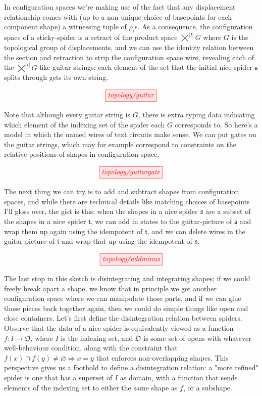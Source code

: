 In configuration spaces we're making use of the fact that any displacement relationship comes with (up to a non-unique choice of basepoints for each component shape)  a witnessing tuple of $\rho_i$s. As a consequence, the configuration space of a sticky-spider is a retract of the product space $\bigtimes^{|I|} G$ where $G$ is the topological group of displacements, and we can use the identity relation between the section and retraction to strip the configuration space wire, revealing each of the $\bigtimes^{|I|} G$ like guitar strings: each element of the set that the initial nice spider $\mathfrak{s}$ splits through gets its own string.

\[\tikzfig{topology/guitar}\]

Note that although every guitar string is $G$, there is extra typing data indicating which element of the indexing set of the spider each $G$ corresponds to. So here's a model in which the named wires of text circuits make sense. We can put gates on the guitar strings, which may for example correspond to constraints on the relative positions of shapes in configuration space.

\[\tikzfig{topology/guitargate}\]

The next thing we can try is to add and subtract shapes from configuration spaces, and while there are technical details like matching choices of basepoints I'll gloss over, the gist is this: when the shapes in a nice spider $\mathfrak{s}$ are a subset of the shapes in a nice spider $\mathfrak{t}$, we can add in states to the guitar-picture of $\mathfrak{s}$ and wrap them up again using the idempotent of $\mathfrak{t}$, and we can delete wires in the guitar-picture of $\mathfrak{t}$ and wrap that up using the idempotent of $\mathfrak{s}$.

\[\tikzfig{topology/addminus}\]

The last stop in this sketch is disintegrating and integrating shapes; if we could freely break apart a shape, we know that in principle we get another configuration space where we can manipulate those parts, and if we can glue those pieces back together again, then we could do simple things like open and close containers. Let's first define the disintegration relation between spiders. Observe that the data of a nice spider is equivalently viewed as a function $f: I \rightarrow \mathfrak{O}$, where $I$ is the indexing set, and $\mathfrak{O}$ is some set of opens with whatever well-behaviour condition, along with the constraint that $f(x) \cap f(y) \neq \varnothing \Rightarrow x = y$ that enforces non-overlapping shapes. This perspective gives us a foothold to define a disintegration relation: a "more refined" spider is one that has a superset of $I$ as domain, with a function that sends elements of the indexing set to either the same shape as $f$, or a subshape.

